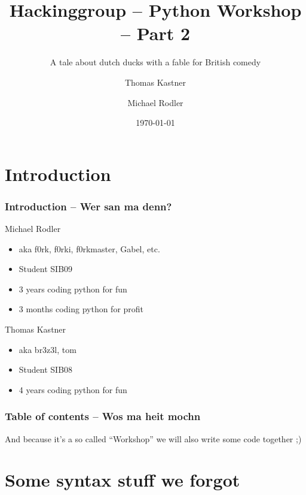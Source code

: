 \documentclass{beamer}
\title[Python Workshop]{Hackinggroup -- Python Workshop -- Part 2}
\subtitle{A tale about dutch ducks with a fable for British comedy}
\author[Thomas Kastner, Michael Rodler]{Thomas Kastner\and Michael Rodler}
\date{\today}
\begin{document}
\begin{frame}
    \titlepage
\end{frame}

\section*{Introduction}

\begin{frame}
    \frametitle{Introduction -- Wer san ma denn?}

    \begin{block}{Michael Rodler}
    \begin{itemize}
        \item aka f0rk, f0rki, f0rkmaster, Gabel, etc.
        \item Student SIB09
        \item 3 years coding python for fun
        \item 3 months coding python for profit
    \end{itemize}
    \end{block}

    \begin{block}{Thomas Kastner}
    \begin{itemize}
        \item aka br3z3l, tom
        \item Student SIB08
        \item 4 years coding python for fun
    \end{itemize}
    \end{block}
\end{frame}


\begin{frame}
    \frametitle{Table of contents -- Wos ma heit mochn}
    \tableofcontents
    And because it's a so called ``Workshop'' we will also write some code together ;)
\end{frame}


\section{Some syntax stuff we forgot}
\end{document}
